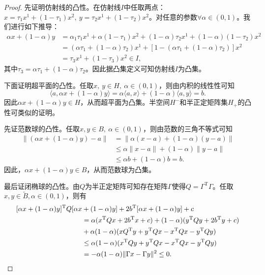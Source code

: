 \begin{proof}
    先证明仿射线的凸性。在仿射线$I$中任取两点：$x = \tau_1 x^1+(1-\tau_1)x^2,\ y = \tau_2 x^1+(1-\tau_2)x^2$。对任意的参数$\forall \alpha\in(0,1)$。我们进行如下推导：
    \[
        \begin{aligned}
            \alpha x+(1-\alpha)y& =\alpha_{1}\tau_{1}x^{1}+\alpha(1-\tau_{1})x^{2}+(1-\alpha)\tau_{2}x^{1}+(1-\alpha)(1-\tau_{2})x^{2}  \\
            &=(\alpha\tau_1+(1-\alpha)\tau_2)x^1+[1-(\alpha\tau_1+(1-\alpha)\tau_2)]x^2 \\
            &=\tau_{3}x^{1}+(1-\tau_{3})x^{2}\in I,
        \end{aligned}
    \]
    其中$\tau_3 = \alpha\tau_1+(1-\alpha)\tau_2$。因此据凸集定义可知仿射线$I$为凸集。

    下面证明超平面的凸性。任取$x,\ y\in H,\ \alpha\in(0,1)$，则由内积的线性性可知
    \[
        \langle a,\alpha x+(1-\alpha)y\rangle=\alpha\langle a,x\rangle+(1-\alpha)\langle a,y\rangle=b.
    \]
    因此$\alpha x+(1-\alpha)y\in H$，从而超平面为凸集。半空间$H^{-}$和半正定矩阵集$H_+$的凸性可类似的证明。

    先证范数球的凸性。任取$x,y\in B,\ \alpha\in(0,1)$，则由范数的三角不等式可知
    \[
        \begin{aligned}
            \|(\alpha x+(1-\alpha)y)-a\|& =\|\alpha(x-a)+(1-\alpha)(y-a)\|  \\
            &\leq\alpha\|x-a\|+(1-\alpha)\|y-a\| \\
            &\leq\alpha b+(1-\alpha)b=b.
        \end{aligned}
    \]
    因此，$\alpha x+ (1-\alpha)y\in B$，从而范数球为凸集。

    最后证闭椭球的凸性。由$Q$为半正定矩阵可知存在矩阵$\Gamma$使得$Q = \Gamma^{\mathrm{T}}\Gamma$。任取$x,y\in \tilde{B},\alpha\in(0,1)$，则有
    \[
        \begin{aligned}
            \relax [\alpha x+(1-\alpha)y]^{\mathrm{T}}Q[\alpha x& +(1-\alpha)y]+2b^{\mathrm{T}}[\alpha x+(1-\alpha)y]+c  \\
            &=\alpha(x^\mathrm{T}Qx+2b^\mathrm{T}x+c)+(1-\alpha)(y^\mathrm{T}Qy+2b^\mathrm{T}y+c) \\
            &+\alpha(1-\alpha)(xQ^\mathrm{T}y+y^\mathrm{T}Qx-x^\mathrm{T}Qx-y^\mathrm{T}Qy) \\
            &\leq\alpha(1-\alpha)(x^\mathrm{T}Qy+y^\mathrm{T}Qx-x^\mathrm{T}Qx-y^\mathrm{T}Qy) \\
            &=-\alpha(1-\alpha)\|\Gamma x-\Gamma y\|^2\leq0.
        \end{aligned}
    \]
\end{proof}
